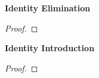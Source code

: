 \vspace{1em}
\begin{multicols}{2}

\vspace{1em}\noindent\textbf{Identity Elimination}


\begin{proof}
	 
\end{proof}




\columnbreak


\vspace{1em}\noindent\textbf{Identity Introduction}

\begin{proof}
	 
\end{proof}

\end{multicols}

%
%
%
